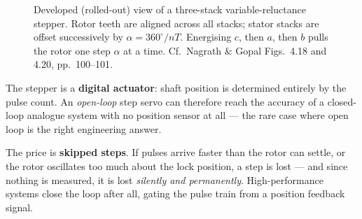 \documentclass[11pt,a4paper]{article}
\begin{document}
\begin{figure}[H]
\centering
{}
\caption{Developed (rolled-out) view of a three-stack variable-reluctance
stepper. Rotor teeth are aligned across all stacks; stator stacks are offset
successively by $\alpha=360^\circ/nT$. Energising $c$, then $a$, then $b$ pulls
the rotor one step $\alpha$ at a time. Cf.\ Nagrath \& Gopal Figs.~4.18 and
4.20, pp.~100--101.}
\label{fig:stepper}
\end{figure}

\begin{keyidea}
The stepper is a \textbf{digital actuator}: shaft position is determined
entirely by the pulse count. An \emph{open-loop} step servo can therefore reach
the accuracy of a closed-loop analogue system with no position sensor at all
--- the rare case where open loop is the right engineering answer.
\end{keyidea}

\begin{pitfall}
The price is \textbf{skipped steps}. If pulses arrive faster than the rotor can
settle, or the rotor oscillates too much about the lock position, a step is
lost --- and since nothing is measured, it is lost \emph{silently and
permanently}. High-performance systems close the loop after all, gating the
pulse train from a position feedback signal.
\end{pitfall}
\end{document}
